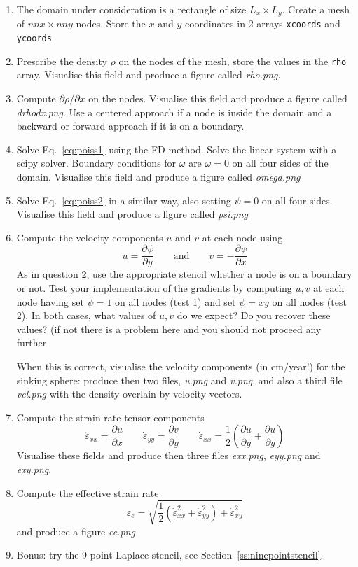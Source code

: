 \begin{enumerate}
\item The domain under consideration is a rectangle of size $L_x \times L_y$. Create a mesh of $nnx \times nny$ nodes. 
Store the $x$ and $y$ coordinates in 2 arrays {\tt xcoords} and {\tt ycoords}
\item Prescribe the density $\rho$ on the nodes of the mesh, store the values in the {\tt rho} array. 
Visualise this field and produce a figure called {\sl rho.png}.
\item Compute $\partial \rho/ \partial x$ on the nodes. Visualise this field and produce a figure called {\sl drhodx.png}. 
Use a centered approach if a node is inside the domain and a backward or forward approach if it is on a boundary.
\item Solve Eq.~\eqref{eq:poiss1} using the FD method. Solve the linear system with a scipy solver. Boundary conditions for $\omega$ are $\omega=0$ on all four sides of the domain.
Visualise this field and produce a figure called {\sl omega.png}
\item Solve Eq.~\eqref{eq:poiss2} in a similar way, also setting $\psi=0$ on all four sides.
Visualise this field and produce a figure called {\sl psi.png}
\item Compute the velocity components $u$ and $v$ at each node using 
\[
u=\frac{\partial \psi}{\partial y} 
\qquad \text{and} \qquad
v=-\frac{\partial \psi}{\partial x} 
\]
As in question 2, use the appropriate stencil whether a node is on a boundary or not.
Test your implementation of the gradients by computing $u,v$ at each node having set $\psi=1$ on all nodes
(test 1) and set $\psi=xy$ on all nodes (test 2). In both cases, what values of $u,v$ do we expect? 
Do you recover these values? (if not there is a problem here and you should not proceed any further 

When this is correct, visualise the velocity components (in cm/year!) for the sinking sphere: produce then 
two files, {\sl u.png} and {\sl v.png}, and also a third file {\sl vel.png} 
with the density overlain by velocity vectors. 

\item Compute the strain rate tensor components
\[
\dot\varepsilon_{xx} =\frac{\partial u}{\partial x} 
\qquad
\dot\varepsilon_{yy} =\frac{\partial v}{\partial y} 
\qquad
\dot\varepsilon_{xx} = \frac12 \left(\frac{\partial u}{\partial y} 
+ \frac{\partial u}{\partial y} \right)
\]
Visualise these fields and produce then three files {\sl exx.png}, {\sl eyy.png} and {\sl exy.png}.

\item Compute the effective strain rate
\[
\varepsilon_e = \sqrt{ \frac{1}{2}(\dot\varepsilon_{xx}^2 + \dot\varepsilon_{yy}^2 ) + \dot\varepsilon_{xy}^2  }
\]
and produce a figure {\sl ee.png}

\item Bonus: try the 9 point Laplace stencil, see Section~\ref{ss:ninepointstencil}.

\end{enumerate}


